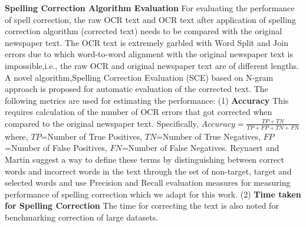 \documentclass[12pt]{article}
\begin{document}
\noindent \textbf{Spelling Correction Algorithm Evaluation }
\label{spell:sce}
For evaluating the performance of spell correction, the raw OCR text and OCR text after application of spelling correction algorithm (corrected text) needs to be compared with the original newspaper text. The OCR text is extremely garbled with Word Split and Join errors due to which word-to-word alignment with the original newspaper text is impossible,i.e., the raw OCR and original newspaper text are of different lengths. A novel algorithm,Spelling Correction Evaluation (SCE) based on N-gram approach is proposed for automatic evaluation of the corrected text. %
The  following metrics are used for estimating the performance:
(1) \textbf{Accuracy }This requires calculation of the number of OCR errors that got corrected when compared to the original newspaper text. Specifically,
$Accuracy=  \frac{TP+TN} {TP+ FP + TN + FN}$ where, $TP$=Number of True Positives, $TN$=Number of True Negatives, $FP$=Number of False Positives, $FN$=Number of False Negatives. %
Reynaert and Martin\cite{reynaert2008all} suggest a way to define these terms by distinguishing between correct words and incorrect words in the text through the set of non-target, target and selected words and use Precision and Recall evaluation measures for measuring performance of spelling correction which we adapt for this work. %
(2) \textbf{Time taken for Spelling Correction } The time for correcting the text is also noted for benchmarking correction of large datasets.
\end{document}
